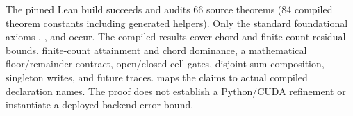 The pinned Lean build succeeds and audits 66 source theorems (84 compiled theorem constants including generated helpers). Only the standard foundational axioms , , and  occur. The compiled results cover chord and finite-count residual bounds, finite-count attainment and chord dominance, a mathematical floor/remainder contract, open/closed cell gates, disjoint-sum composition, singleton writes, and future traces.  maps the claims to actual compiled declaration names. The proof does not establish a Python/CUDA refinement or instantiate a deployed-backend error bound.
